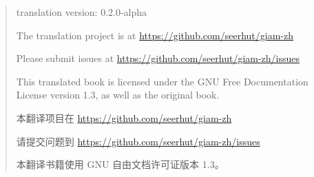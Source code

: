\rule{0pt}{0pt}

\vfill

\begin{quote}
    translation version: 0.2.0-alpha

    The translation project is at \newline\url{https://github.com/seerhut/giam-zh} 

    Please submit issues at \newline\url{https://github.com/seerhut/giam-zh/issues}

    This translated book is licensed under the GNU Free Documentation License version 1.3, as well as the original book.

    本翻译项目在 \url{https://github.com/seerhut/giam-zh}

    请提交问题到 \url{https://github.com/seerhut/giam-zh/issues}

    本翻译书籍使用 GNU 自由文档许可证版本 1.3。
\end{quote}




\vfill